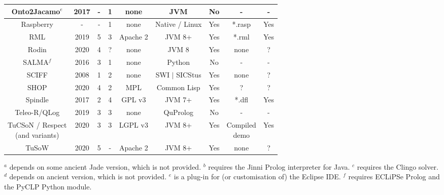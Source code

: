 \begin{table}
\begin{adjustbox}{width=.8\textwidth,center}
\begin{tabular}{c|cccccccc}
\hline
Onto2Jacamo$^e$ & 2017 & - & 1 & none & JVM & No & - & - \\
\hline
Raspberry & - & - & 1 & none & Native / Linux & Yes & *.rasp & Yes \\
\hline
RML & 2019 & 5 & 3 & Apache 2 & JVM 8+ & Yes & *.rml & Yes \\
\hline
Rodin & 2020 & 4 & ? & none & JVM 8 & Yes & none & ? \\
\hline
SALMA$^f$ & 2016 & 3 & 1 & none & Python & No & - & - \\
\hline
SCIFF & 2008 & 1 & 2 & none & SWI $\mid$ SICStus & Yes & none & ? \\
\hline
SHOP & 2020 & 4 & 2 & MPL & Common Lisp & Yes & ? & ? \\
\hline
Spindle & 2017 & 2 & 4 & GPL v3 & JVM 7+ & Yes & *.dfl & Yes \\
\hline
Teleo-R/QLog & 2019 & 3 & 3 & none & QuProlog & No & - & - \\
\hline
\makecell{TuCSoN / Respect\\ (and variants)} & 2020 & 3 & 3 & LGPL v3 & JVM 8+ & Yes & \makecell{Compiled\\demo} & Yes \\
\hline
TuSoW & 2020 & 5 & - & Apache 2 & JVM 8+ & Yes & none & ? \\
\hline\hline
\end{tabular}
\end{adjustbox}

\tiny
    $^a$ depends on some ancient Jade version, which is not provided.
    $^b$ requires the Jinni Prolog interpreter for Java.
    $^c$ requires the Clingo solver.
    $^d$ depends on ancient \tuprolog{} version, which is not provided.
    $^e$ is a plug-in for (or customisation of) the Eclipse IDE.
    $^f$ requires ECLiPSe Prolog and the PyCLP Python module.
\end{table}
